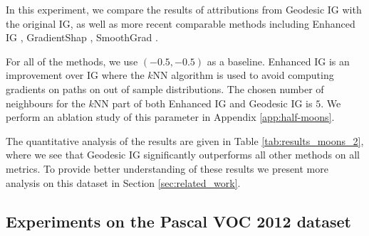 In this experiment, we compare the results of attributions from Geodesic IG with the original IG, as well as more recent comparable methods including Enhanced IG \citep{jha2020enhanced}, GradientShap \citep{lundberg2017unified}, SmoothGrad \citep{smilkov2017smoothgrad}.

For all of the methods, we use $(-0.5, -0.5)$ as a baseline. Enhanced IG is an improvement over IG where the $k$NN algorithm is used to avoid computing gradients on paths on out of sample distributions. The chosen number of neighbours for the $k$NN part of both Enhanced IG and Geodesic IG is $5$. We perform an ablation study of this parameter in Appendix \ref{app:half-moons}. 

\begin{table}[t]
	\centering
	\caption{Evaluation of different attribution methods on a half-moons dataset with Gaussian noise $\mathcal{N}(0, 0.2)$. We present in Appendix \ref{app:half-moons} more results with different amounts of Gaussian noise.}
	\label{tab:results_moons_2}
\end{table}

The quantitative analysis of the results are given in Table \ref{tab:results_moons_2}, where we see that Geodesic IG significantly outperforms all other methods on all metrics. To provide better understanding of these results we present more analysis on this dataset in Section \ref{sec:related_work}.

\subsection{Experiments on the Pascal VOC 2012 dataset}
\label{subsec:voc}

